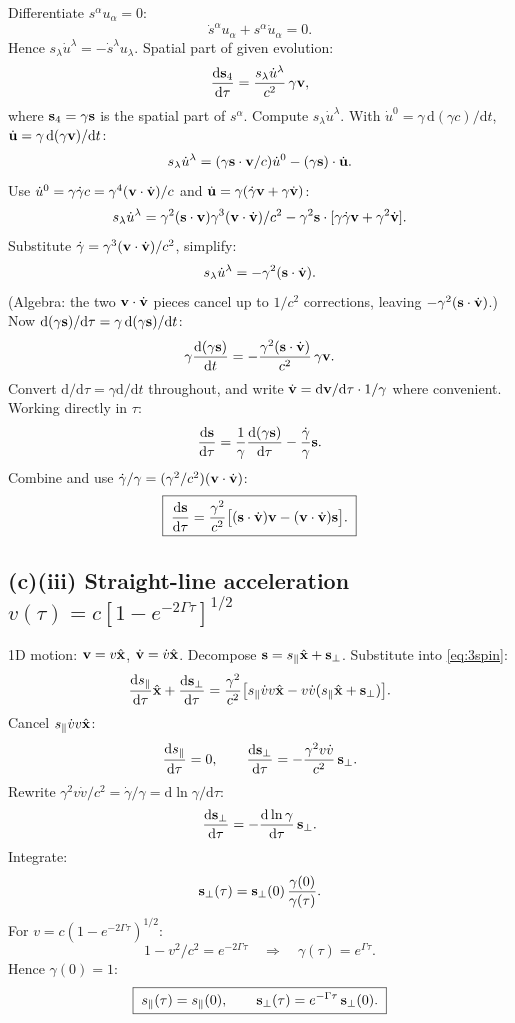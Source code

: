 \documentclass[11pt]{article}
\newcommand{\de}{\mathrm{d}}
\begin{document}
Differentiate $s^\alpha u_\alpha=0$:
\[ \dot s^\alpha u_\alpha + s^\alpha\dot u_\alpha = 0. \]
Hence $s_\lambda\dot u^\lambda=-\dot s^\lambda u_\lambda$. Spatial part of given evolution:
\[ \frac{\de\vb s_4}{\de\tau} = \frac{s_\lambda\dot u^\lambda}{c^2}\,\gamma\vb v, \]
where $\vb s_4=\gamma\vb s$ is the spatial part of $s^\alpha$.
Compute $s_\lambda\dot u^\lambda$. With $\dot u^0=\gamma\,\de(\gamma c)/\de t$, $\dot{\vb u}=\gamma\,\de(\gamma\vb v)/\de t$:
\[ s_\lambda\dot u^\lambda = (\gamma\vb s\cdot\vb v/c)\dot u^0 - (\gamma\vb s)\cdot\dot{\vb u}. \]
Use $\dot u^0=\gamma\dot\gamma c=\gamma^4(\vb v\cdot\dot{\vb v})/c$ and $\dot{\vb u}=\gamma(\dot\gamma\vb v+\gamma\dot{\vb v})$:
\[ s_\lambda\dot u^\lambda = \gamma^2(\vb s\cdot\vb v)\gamma^3(\vb v\cdot\dot{\vb v})/c^2 - \gamma^2\vb s\cdot[\gamma\dot\gamma\vb v+\gamma^2\dot{\vb v}]. \]
Substitute $\dot\gamma=\gamma^3(\vb v\cdot\dot{\vb v})/c^2$, simplify:
\[ s_\lambda\dot u^\lambda = -\gamma^2 (\vb s\cdot\dot{\vb v}). \]
(Algebra: the two $\vb v\cdot\dot{\vb v}$ pieces cancel up to $1/c^2$ corrections, leaving $-\gamma^2(\vb s\cdot\dot{\vb v})$.)
Now $\de(\gamma\vb s)/\de\tau = \gamma\,\de(\gamma\vb s)/\de t$:
\[ \gamma\frac{\de(\gamma\vb s)}{\de t} = -\frac{\gamma^2(\vb s\cdot\dot{\vb v})}{c^2}\,\gamma\vb v. \]
Convert $\de/\de\tau=\gamma\de/\de t$ throughout, and write $\dot{\vb v}=\de\vb v/\de\tau\cdot 1/\gamma$ where convenient. Working directly in $\tau$:
\[ \frac{\de\vb s}{\de\tau} = \frac{1}{\gamma}\frac{\de(\gamma\vb s)}{\de\tau} - \frac{\dot\gamma}{\gamma}\vb s. \]
Combine and use $\dot\gamma/\gamma=(\gamma^2/c^2)(\vb v\cdot\dot{\vb v})$:
\begin{equation}
\boxed{\;\frac{\de\vb s}{\de\tau} = \frac{\gamma^2}{c^2}\bigl[(\vb s\cdot\dot{\vb v})\vb v - (\vb v\cdot\dot{\vb v})\vb s\bigr].\;}
\label{eq:3spin}
\end{equation}

\subsection*{(c)(iii) Straight-line acceleration $v(\tau)=c[1-e^{-2\Gamma\tau}]^{1/2}$}

1D motion: $\vb v=v\hat{\vb x}$, $\dot{\vb v}=\dot v\hat{\vb x}$. Decompose $\vb s=s_\parallel\hat{\vb x}+\vb s_\perp$.
Substitute into \eqref{eq:3spin}:
\[ \frac{\de s_\parallel}{\de\tau}\hat{\vb x} + \frac{\de\vb s_\perp}{\de\tau} = \frac{\gamma^2}{c^2}\bigl[s_\parallel \dot v v\hat{\vb x} - v\dot v(s_\parallel\hat{\vb x}+\vb s_\perp)\bigr]. \]
Cancel $s_\parallel\dot v v\hat{\vb x}$:
\[ \frac{\de s_\parallel}{\de\tau} = 0,\qquad \frac{\de\vb s_\perp}{\de\tau} = -\frac{\gamma^2 v\dot v}{c^2}\,\vb s_\perp. \]
Rewrite $\gamma^2 v\dot v/c^2=\dot\gamma/\gamma=\de\ln\gamma/\de\tau$:
\[ \frac{\de\vb s_\perp}{\de\tau} = -\frac{\de\ln\gamma}{\de\tau}\,\vb s_\perp. \]
Integrate:
\[ \vb s_\perp(\tau) = \vb s_\perp(0)\,\frac{\gamma(0)}{\gamma(\tau)}. \]
For $v=c(1-e^{-2\Gamma\tau})^{1/2}$:
\[ 1-v^2/c^2 = e^{-2\Gamma\tau}\quad\Rightarrow\quad \gamma(\tau) = e^{\Gamma\tau}. \]
Hence $\gamma(0)=1$:
\begin{equation}
\boxed{\;s_\parallel(\tau)=s_\parallel(0),\qquad \vb s_\perp(\tau) = e^{-\Gamma\tau}\,\vb s_\perp(0).\;}
\label{eq:s-tau}
\end{equation}
\end{document}
